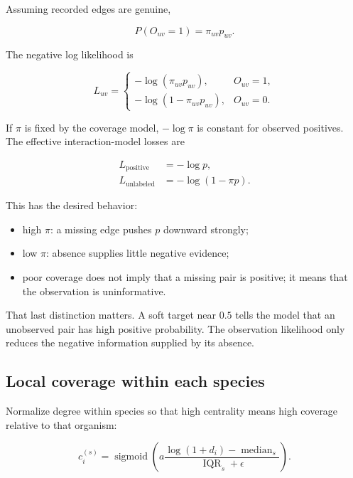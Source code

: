 \documentclass[11pt,a4paper]{article}
\begin{document}
Assuming recorded edges are genuine,

\begin{equation}
  P(O_{uv}=1) = \pi_{uv}p_{uv}.
\end{equation}

The negative log likelihood is

\begin{equation}
L_{uv}=
\begin{cases}
  -\log(\pi_{uv}p_{uv}), & O_{uv}=1,\\[4pt]
  -\log(1-\pi_{uv}p_{uv}), & O_{uv}=0.
\end{cases}
\end{equation}

If $\pi$ is fixed by the coverage model, $-\log\pi$ is constant for observed
positives. The effective interaction-model losses are

\begin{align}
  L_{\mathrm{positive}} &= -\log p,\\
  L_{\mathrm{unlabeled}} &= -\log(1-\pi p).
\end{align}

This has the desired behavior:

\begin{itemize}
  \item high $\pi$: a missing edge pushes $p$ downward strongly;
  \item low $\pi$: absence supplies little negative evidence;
  \item poor coverage does not imply that a missing pair is positive; it means
        that the observation is uninformative.
\end{itemize}

That last distinction matters. A soft target near $0.5$ tells the model that an
unobserved pair has high positive probability. The observation likelihood only
reduces the negative information supplied by its absence.

\subsection{Local coverage within each species}

Normalize degree within species so that high centrality means high coverage
relative to that organism:

\begin{equation}
  c_i^{(s)} =
  \operatorname{sigmoid}\left(
    a\frac{\log(1+d_i)-\operatorname{median}_s}
           {\operatorname{IQR}_s+\epsilon}
  \right).
\end{equation}
\end{document}
